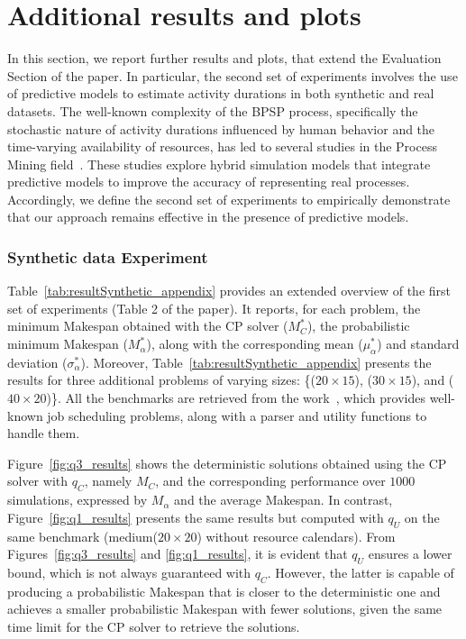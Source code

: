 \documentclass{article}
\newcommand{\act}[1]{\textsf{\footnotesize #1}}
\begin{document}
\section*{Additional results and plots}

In this section, we report further results and plots, that extend the Evaluation Section of the paper. In particular, the second set of experiments involves the use of predictive models to estimate activity durations in both synthetic and real datasets. The well-known complexity of the BPSP process, specifically the stochastic nature of activity durations influenced by human behavior and the time-varying availability of resources, has led to several studies in the Process Mining field~\cite{CamargoDR22,Meneghello_2024}. These studies explore hybrid simulation models that integrate predictive models to improve the accuracy of representing real processes. Accordingly, we define the second set of experiments to empirically demonstrate that our approach remains effective in the presence of predictive models.


\subsubsection{Synthetic data Experiment}

Table~\ref{tab:resultSynthetic_appendix} provides an extended overview of the first set of experiments (Table 2 of the paper). 
It reports, for each problem, the minimum Makespan obtained with the CP solver ($M^*_{C}$), the probabilistic minimum Makespan ($M^*_{\alpha}$), along with the corresponding mean ($\mu^*_{\alpha}$) and standard deviation ($\sigma^*_{\alpha}$).  
Moreover, Table~\ref{tab:resultSynthetic_appendix} presents the results for three additional problems of varying sizes: \{($20 \times 15$), ($30 \times 15$), and ($40 \times 20$)\}. All the benchmarks are retrieved from the work~\cite{beanchmarks}, which provides well-known job scheduling problems, along with a parser and utility functions to handle them.

Figure~\ref{fig:q3_results} shows the deterministic solutions obtained using the CP solver with $q_C$, namely $M_C$, and the corresponding performance over $1000$ simulations, expressed by $M_\alpha$ and the average Makespan. In contrast, Figure~\ref{fig:q1_results} presents the same results but computed with $q_U$ on the same benchmark (\act{medium}($20 \times 20$) without resource calendars). From Figures~\ref{fig:q3_results} and \ref{fig:q1_results}, it is evident that $q_U$ ensures a lower bound, which is not always guaranteed with $q_C$. However, the latter is capable of producing a probabilistic Makespan that is closer to the deterministic one and achieves a smaller probabilistic Makespan with fewer solutions, given the same time limit for the CP solver to retrieve the solutions.
\end{document}
